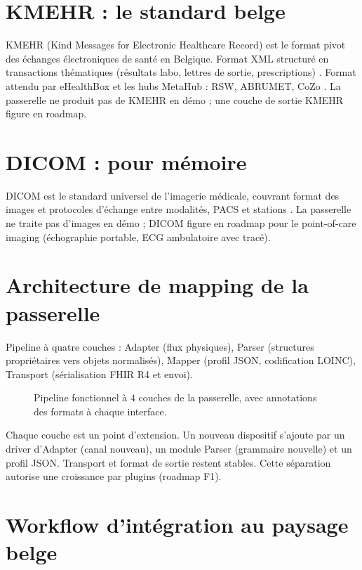 \section{KMEHR : le standard belge}
\label{sec:kmehr}

KMEHR (Kind Messages for Electronic Healthcare Record) est le format pivot des échanges électroniques de santé en Belgique. Format XML structuré en transactions thématiques (résultats labo, lettres de sortie, prescriptions) \cite{kmehr_spec}. Format attendu par eHealthBox et les hubs MetaHub : RSW, ABRUMET, CoZo \cite{ehealth_services_base}. La passerelle ne produit pas de KMEHR en démo ; une couche de sortie KMEHR figure en roadmap.

\section{DICOM : pour mémoire}
\label{sec:dicom}

DICOM est le standard universel de l'imagerie médicale, couvrant format des images et protocoles d'échange entre modalités, PACS et stations \cite{dicom_standard}. La passerelle ne traite pas d'images en démo ; DICOM figure en roadmap pour le point-of-care imaging (échographie portable, ECG ambulatoire avec tracé).

\section{Architecture de mapping de la passerelle}
\label{sec:archi-mapping}

Pipeline à quatre couches : Adapter (flux physiques), Parser (structures propriétaires vers objets normalisés), Mapper (profil JSON, codification LOINC), Transport (sérialisation FHIR R4 et envoi).

\begin{figure}[h]
  \centering
  \resizebox{\linewidth}{!}{}
  \caption{Pipeline fonctionnel à 4 couches de la passerelle, avec annotations des formats à chaque interface.}
  \label{fig:rapport-pipeline}
\end{figure}

Chaque couche est un point d'extension. Un nouveau dispositif s'ajoute par un driver d'Adapter (canal nouveau), un module Parser (grammaire nouvelle) et un profil JSON. Transport et format de sortie restent stables. Cette séparation autorise une croissance par plugins (roadmap F1).

\section{Workflow d'intégration au paysage belge}
\label{sec:workflow-belge}

